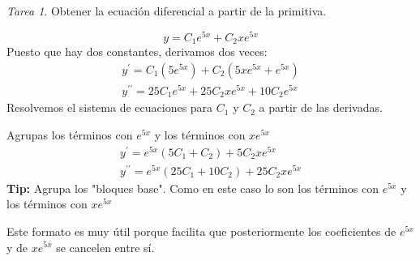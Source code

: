 \documentclass[12pt]{article} %
\theoremstyle{remark} %
\newtheorem{tarea}{Tarea}[section] %
\newcounter{ejercicio}[tarea]
\begin{document}
\begin{tarea}
  \label{tarea:Primitivas}
  Obtener la ecuación diferencial a partir de la primitiva.

  \begin{ejercicio}[1]
    \label{ejercicio:primitivas:guess}
  \[ y = C_1 e^{5x} + C_2 xe^{5x} \]
  Puesto que hay dos constantes, derivamos dos veces:
  \begin{gather*}
    y^{\prime} = C_1 (5e^{5x}) + C_2 (5xe^{5x} + e^{5x})\\
    y^{\prime \prime} = 25C_1e^{5x} + 25C_2xe^{5x} + 10C_2e^{5x}
  \end{gather*}
  Resolvemos el sistema de ecuaciones para $C_1$ y $C_2$ a partir de las derivadas.

  Agrupas los términos con $e^{5x}$ y los términos con $xe^{5x}$
  \begin{gather*}
    y^{\prime} = e^{5x} (5C_1 + C_2) + 5C_2xe^{5x}\\
    y^{\prime \prime} = e^{5x}(25C_1 + 10C_2) + 25C_2xe^{5x}
  \end{gather*}
  \textbf{Tip:} Agrupa los "bloques base". Como en este caso lo son los términos con $e^{5x}$ y los términos con $xe^{5x}$

  Este formato es muy útil porque facilita que posteriormente los coeficientes de $e^{5x}$ y de $xe^{5x}$ se cancelen entre sí.


\end{ejercicio}
\end{tarea}
\end{document}
